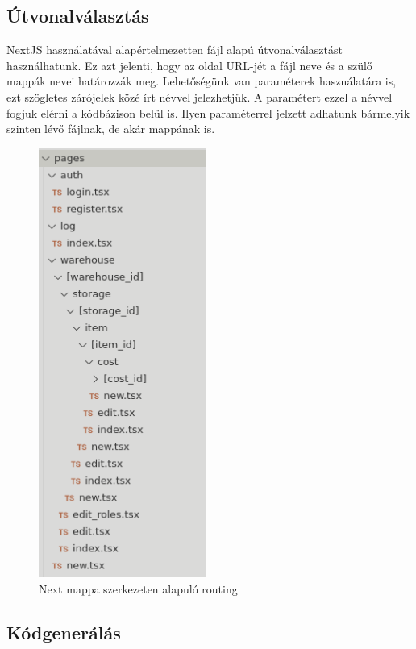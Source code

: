 
\subsection{Útvonalválasztás}
NextJS használatával alapértelmezetten fájl alapú útvonalválasztást használhatunk.
Ez azt jelenti, hogy az oldal URL-jét a fájl neve és a szülő mappák nevei határozzák meg.
Lehetőségünk van paraméterek használatára is, ezt szögletes zárójelek közé írt névvel jelezhetjük.
A paramétert ezzel a névvel fogjuk elérni a kódbázison belül is.
Ilyen paraméterrel jelzett adhatunk bármelyik szinten lévő fájlnak, de akár mappának is.

\begin{figure}[!ht]
  \centering
  \includegraphics[width=55mm, keepaspectratio]{figures/next_routing.png}
  \caption{Next mappa szerkezeten alapuló routing}
  \label{fig:NextRouting}
\end{figure}


\subsection{Kódgenerálás}

